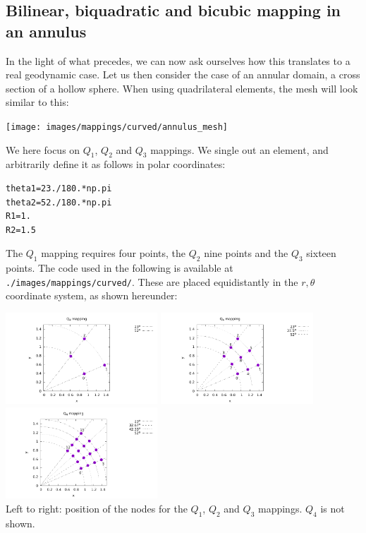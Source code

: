 \subsection{Bilinear, biquadratic and bicubic mapping in an annulus }

In the light of what precedes, we can now ask ourselves how this translates to 
a real geodynamic case. Let us then consider the case of an annular domain, 
a cross section of a hollow sphere. 
When using quadrilateral elements, the mesh will look similar to this:

\begin{center}
\texttt{[image: images/mappings/curved/annulus\_mesh]}
\end{center}

We here focus on $Q_1$, $Q_2$ and $Q_3$ mappings. We single out an element, 
and arbitrarily define it as follows in polar coordinates:
\begin{lstlisting}
theta1=23./180.*np.pi
theta2=52./180.*np.pi
R1=1.
R2=1.5
\end{lstlisting}
The $Q_1$ mapping requires four points, the $Q_2$ nine points and the $Q_3$
sixteen points. 
The code used in the following is available at {\tt ./images/mappings/curved/}.
These are placed equidistantly in the $r,\theta$ coordinate
system, as shown hereunder:

\begin{center}
\includegraphics[width=5.7cm]{images/mappings/curved/nodesQ1.pdf}
\includegraphics[width=5.7cm]{images/mappings/curved/nodesQ2.pdf}
\includegraphics[width=5.7cm]{images/mappings/curved/nodesQ3.pdf}\\
{\captionfont Left to right: position of the nodes for the $Q_1$, $Q_2$ and $Q_3$ mappings.
$Q_4$ is not shown.}
\end{center}

